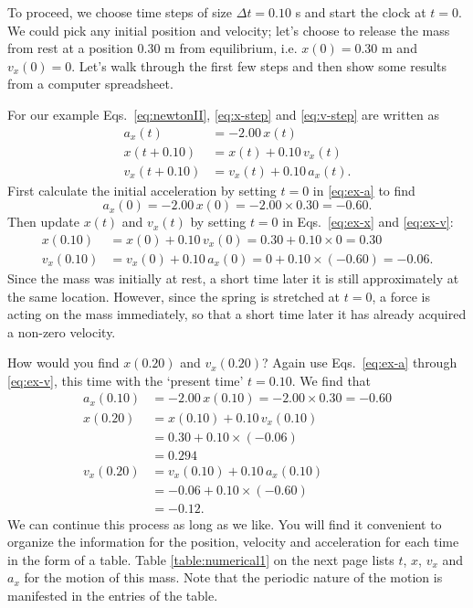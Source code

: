 To proceed, we choose time steps of size $\Delta t = 0.10$ s and start
the clock at $t = 0$.  We could pick any initial position and
velocity; let's choose to release the mass from rest at a position
0.30 m from equilibrium, i.e. $x(0) = 0.30$ m and $v_x(0) = 0$.  Let's
walk through the first few steps and then show some results from a
computer spreadsheet.
   
For our example Eqs.~\eqref{eq:newtonII}, \eqref{eq:x-step} and
\eqref{eq:v-step} are written as
\begin{align}
a_x(t) &= -2.00\, x(t) 
\label{eq:ex-a}\\
x(t+0.10) &= x(t) + 0.10\, v_x(t) 
\label{eq:ex-x}\\
v_x(t+0.10) &= v_x(t) + 0.10\, a_x(t).
\label{eq:ex-v}
\end{align}
First calculate the initial acceleration by setting $t = 0$ in
\eqref{eq:ex-a} to find
\begin{equation}
a_x(0) = -2.00\, x(0)  = -2.00 \times 0.30 = -0.60.
\end{equation}
Then update $x(t)$ and $v_x(t)$ by setting $t = 0$ in Eqs.~\eqref{eq:ex-x} and 
\eqref{eq:ex-v}:
\begin{align}
x(0.10) &= x(0) + 0.10\, v_x(0) = 0.30 + 0.10\times 0 = 0.30 \\
v_x(0.10) &= v_x(0) + 0.10\, a_x(0) = 0 + 0.10\times(-0.60) = -0.06.
\end{align}
Since the mass was initially at rest, a short time later it is still
approximately at the same location.  However, since the spring is
stretched at $t = 0$, a force is acting on the mass immediately, so
that a short time later it has already acquired a non-zero velocity.
   
How would you find $x(0.20)$ and $v_x(0.20)$?  Again use
Eqs.~\eqref{eq:ex-a} through \eqref{eq:ex-v}, this time with the
`present time' $t = 0.10$.  We find that
\begin{align}
a_x(0.10) &= -2.00\, x(0.10) = -2.00\times 0.30 = -0.60\\
x(0.20) &= x(0.10) + 0.10\, v_x(0.10)  \\
        &= 0.30 + 0.10 \times (-0.06)  \\
        &= 0.294 \\
v_x(0.20) &= v_x(0.10) + 0.10\, a_x(0.10)   \\
        &= -0.06 + 0.10\times(-0.60)  \\
        &= -0.12.
\end{align}
We can continue this process as long as we like.  You will find it
convenient to organize the information for the position, velocity and
acceleration for each time in the form of a table.  Table
\ref{table:numerical1} on the next page lists $t$, $x$, $v_x$ and $a_x$ for
the motion of this mass.  Note that the periodic nature of the motion
is manifested in the entries of the table.  

